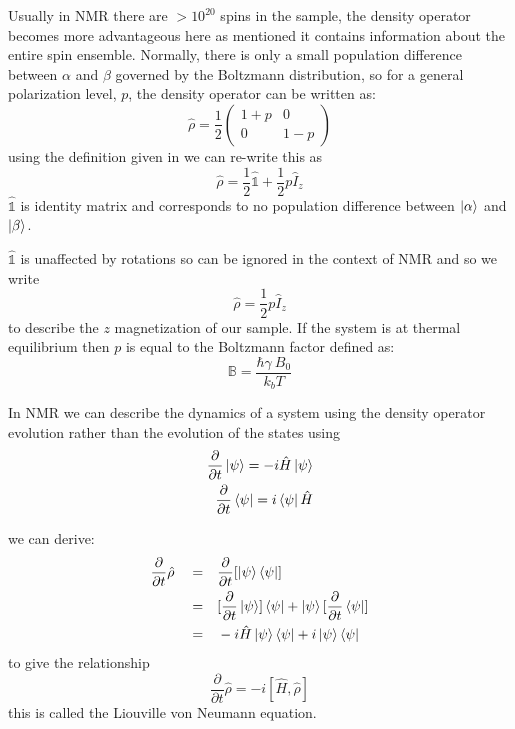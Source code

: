 Usually in NMR there are $>10^{20}$ spins in the sample, the density operator becomes more advantageous here
as mentioned it contains information about the entire spin ensemble. Normally, there is only a small population difference between $\alpha$ and $\beta$
governed by the Boltzmann distribution,
so for a general polarization level, $p$, the density operator can be written as:
\begin{equation}
  \hat\rho = \frac{1}{2}\begin{pmatrix}
    1 + p & 0\\
    0 & 1 - p
\end{pmatrix}
\end{equation}
using the definition given in  we can re-write this as
\begin{equation}
  \hat\rho = \frac{1}{2}\hat{\mathbb{1}} + \frac{1}{2}p\hat{I}_z
\end{equation}
$\hat{\mathbb{1}}$ is identity matrix and corresponds to no population difference between $\ket{\alpha}$ and $\ket{\beta}$.

$\hat{\mathbb{1}}$ is unaffected by rotations so can be ignored in the context of NMR
and so we write
\begin{equation}
  \hat{\rho} = \frac{1}{2}p\hat{I}_z
\end{equation}
to describe the $z$ magnetization of our sample. If the system is at thermal equilibrium
then $p$ is equal to the Boltzmann factor defined as:
\begin{equation}
  \mathbb{B} = \frac{\hbar\gamma~B_0}{k_bT}
\end{equation}


In NMR we can  describe the dynamics of a system using the density operator evolution rather than the evolution of the states using
\begin{align}
  \frac{\partial}{\partial{t}}\ket{\psi} = -i\hat{H}\ket{\psi}\\
  \frac{\partial}{\partial{t}}\bra{\psi} = i\bra{\psi}\hat{H}
\end{align}

we can derive\citep{Neumann2018}:
\begin{align}
  \frac{\partial}{\partial{t}}\hat\rho\quad=&\quad \frac{\partial}{\partial{t}}[\ket{\psi}\bra{\psi}]\\
  =&\quad[\frac{\partial}{\partial{t}}\ket{\psi}]\bra{\psi} + \ket{\psi}[\frac{\partial}{\partial{t}}\bra{\psi}]\\
  =&\quad-i\hat{H}\ket{\psi}\bra{\psi} + i\ket{\psi}\bra{\psi}
\end{align}
to give the relationship
\begin{equation}
  \frac{\partial}{\partial{t}}\hat\rho = -i[\hat{H},\hat\rho]
\end{equation}
this is called the Liouville von Neumann equation.

